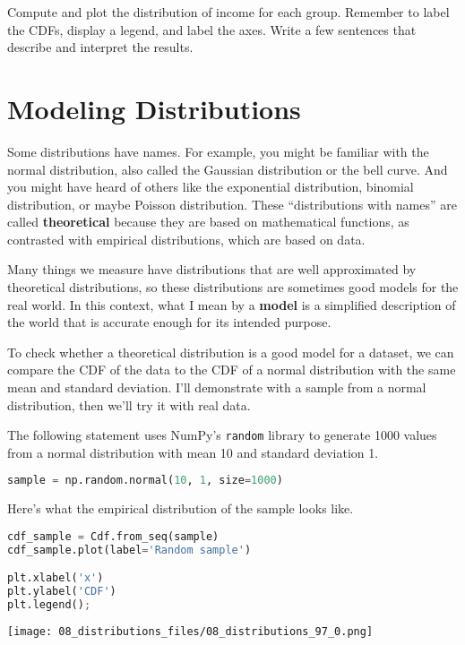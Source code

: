 Compute and plot the distribution of income for each group. Remember to
label the CDFs, display a legend, and label the axes. Write a few
sentences that describe and interpret the results.

\section{Modeling Distributions}\label{modeling-distributions}

Some distributions have names. For example, you might be familiar with
the normal distribution, also called the Gaussian distribution or the
bell curve. And you might have heard of others like the exponential
distribution, binomial distribution, or maybe Poisson distribution.
These ``distributions with names'' are called \textbf{theoretical}
because they are based on mathematical functions, as contrasted with
empirical distributions, which are based on data.

Many things we measure have distributions that are well approximated by
theoretical distributions, so these distributions are sometimes good
models for the real world. In this context, what I mean by a
\textbf{model} is a simplified description of the world that is accurate
enough for its intended purpose.

To check whether a theoretical distribution is a good model for a
dataset, we can compare the CDF of the data to the CDF of a normal
distribution with the same mean and standard deviation. I'll demonstrate
with a sample from a normal distribution, then we'll try it with real
data.

The following statement uses NumPy's \passthrough{\lstinline!random!}
library to generate 1000 values from a normal distribution with mean 10
and standard deviation 1.

\begin{lstlisting}[language=Python,style=source]
sample = np.random.normal(10, 1, size=1000)
\end{lstlisting}

Here's what the empirical distribution of the sample looks like.

\begin{lstlisting}[language=Python,style=source]
cdf_sample = Cdf.from_seq(sample)
cdf_sample.plot(label='Random sample')

plt.xlabel('x')
plt.ylabel('CDF')
plt.legend();
\end{lstlisting}

\begin{center}
\texttt{[image: 08\_distributions\_files/08\_distributions\_97\_0.png]}
\end{center}

